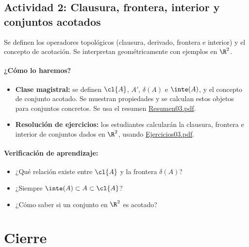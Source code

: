 \documentclass[a4,11pt]{aleph-notas}
\begin{document}
\subsection*{Actividad 2: Clausura, frontera, interior y conjuntos acotados}
Se definen los operadores topológicos (clausura, derivado, frontera e interior) y el concepto de acotación. Se interpretan geométricamente con ejemplos en $\R^2$.

\paragraph{¿Cómo lo haremos?}
\begin{itemize}[leftmargin=*]
    \item \textbf{Clase magistral:} se definen $\cl{A}$, $A'$, $\delta(A)$ e $\inte(A)$, y el concepto de conjunto acotado. Se muestran propiedades y se calculan estos objetos para conjuntos concretos. Se usa el resumen \href{https://andres-merino.github.io/MatematicaIII-05-N0051/01Resumen/Resumen03.pdf}{Resumen03.pdf}.
    \item \textbf{Resolución de ejercicios:} los estudiantes calcularán la clausura, frontera e interior de conjuntos dados en $\R^2$, usando \href{https://andres-merino.github.io/MatematicaIII-05-N0051/04Ejercicios/Ejercicios03.pdf}{Ejercicios03.pdf}.
\end{itemize}

\paragraph{Verificación de aprendizaje:}
\begin{itemize}[leftmargin=*]
    \item ¿Qué relación existe entre $\cl{A}$ y la frontera $\delta(A)$?
    \item ¿Siempre $\inte(A)\subset A\subset \cl{A}$?
    \item ¿Cómo saber si un conjunto en $\R^2$ es acotado?
\end{itemize}

\section*{Cierre}

\end{document}
